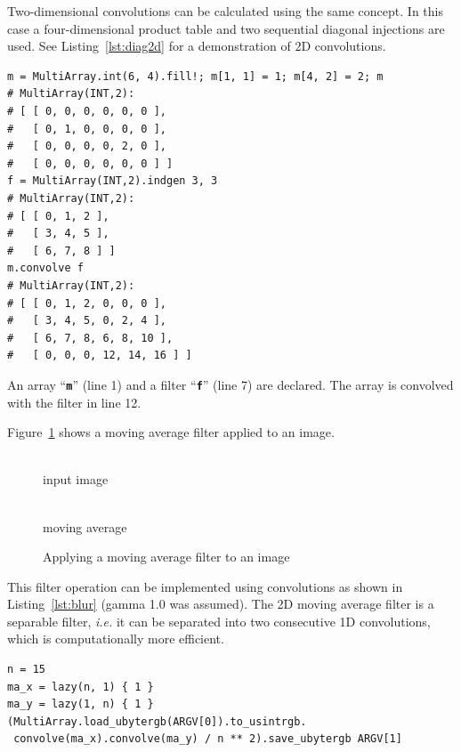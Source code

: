 \documentclass[12pt,a4paper,oneside,openright]{book}
\newcommand{\ie}{\emph{i.e.} }
\newcommand{\fig}[1]{Figure~\ref{fig:#1}}
\newcommand{\lst}[1]{Listing~\ref{lst:#1}}
\newcommand{\code}[1]{``\texttt{\textbf{\textcolor{codegray}{\small{#1}}}}''}
\begin{document}
\begin{CJK}{UTF8}{}
Two-dimensional convolutions can be calculated using the same concept. In this case a four-dimensional product table and two sequential diagonal injections are used. See \lst{diag2d} for a demonstration of \ac{2D} convolutions.
\lstset{language=Ruby,frame=single,numbers=left}
\begin{lstlisting}[float,caption={Two-dimensional convolutions in Ruby},label=lst:diag2d]
m = MultiArray.int(6, 4).fill!; m[1, 1] = 1; m[4, 2] = 2; m
# MultiArray(INT,2):
# [ [ 0, 0, 0, 0, 0, 0 ],
#   [ 0, 1, 0, 0, 0, 0 ],
#   [ 0, 0, 0, 0, 2, 0 ],
#   [ 0, 0, 0, 0, 0, 0 ] ]
f = MultiArray(INT,2).indgen 3, 3
# MultiArray(INT,2):
# [ [ 0, 1, 2 ],
#   [ 3, 4, 5 ],
#   [ 6, 7, 8 ] ]
m.convolve f
# MultiArray(INT,2):
# [ [ 0, 1, 2, 0, 0, 0 ],
#   [ 3, 4, 5, 0, 2, 4 ],
#   [ 6, 7, 8, 6, 8, 10 ],
#   [ 0, 0, 0, 12, 14, 16 ] ]
\end{lstlisting}
An array \code{m} (line 1) and a filter \code{f} (line 7) are declared. The array is convolved with the filter in line 12.

\fig{blur} shows a moving average filter applied to an image.
\begin{figure}[htbp]
  \begin{center}
    \begin{minipage}[t]{.45\textwidth}
      \begin{center}
        \\
        input image
      \end{center}
    \end{minipage}
    \hspace{.5cm}
    \begin{minipage}[t]{.45\textwidth}
      \begin{center}
        \\
        moving average
      \end{center}
    \end{minipage}
    \caption{Applying a moving average filter to an image\label{fig:blur}}
  \end{center}
\end{figure}
This filter operation can be implemented using convolutions as shown in \lst{blur} (gamma 1.0 was assumed). The \ac{2D} moving average filter is a separable filter, \ie it can be separated into two consecutive \ac{1D} convolutions, which is computationally more efficient.
\lstset{language=Ruby,frame=single,numbers=none}
\begin{lstlisting}[float,caption={Moving average filter implemented using convolutions},label=lst:blur]
n = 15
ma_x = lazy(n, 1) { 1 }
ma_y = lazy(1, n) { 1 }
(MultiArray.load_ubytergb(ARGV[0]).to_usintrgb.
 convolve(ma_x).convolve(ma_y) / n ** 2).save_ubytergb ARGV[1]
\end{lstlisting}


\end{CJK}
\end{document}
